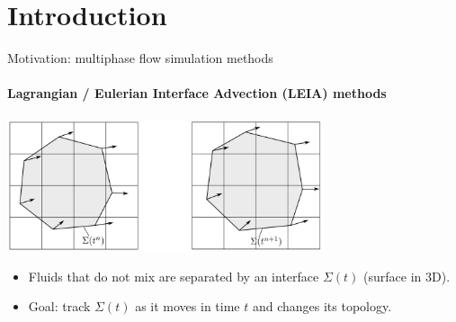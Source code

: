 \section{Introduction}

\begin{frame}{Motivation: multiphase flow simulation methods}
    \framesubtitle{Lagrangian / Eulerian Interface Advection (LEIA) methods}

    \begin{center}
    \includegraphics[width=0.7\textwidth]{figures/interface.png}
    \end{center}
    \begin{itemize}
        \item Fluids that do not mix are separated by an interface $\Sigma(t)$ (surface in 3D). 
        \item Goal: track $\Sigma(t)$ as it moves in time $t$ and changes its topology. 
    \end{itemize}

\end{frame}

